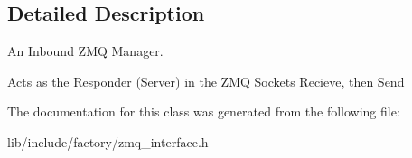\subsection{Detailed Description}
An Inbound Z\-M\-Q Manager. 

Acts as the Responder (Server) in the Z\-M\-Q Sockets Recieve, then Send 

The documentation for this class was generated from the following file\-:\begin{DoxyCompactItemize}
\item 
lib/include/factory/zmq\-\_\-interface.\-h\end{DoxyCompactItemize}
